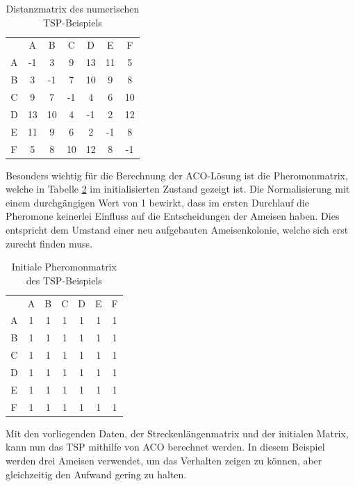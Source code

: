 	\begin{table}
		\centering
		\footnotesize
		\begin{tabular}{c c c c c c c}
			  & A & B & C & D & E & F \\
			A & -1 & 3 & 9 & 13 & 11 & 5\\ 
			B & 3 & -1 & 7 & 10 & 9 & 8\\ 
			C & 9 & 7 & -1 & 4 & 6 & 10\\
			D & 13 & 10 & 4 & -1 & 2 & 12\\
			E & 11 & 9 & 6 & 2 & -1 & 8\\
			F & 5 & 8 & 10 & 12 & 8 & -1\\
		\end{tabular}
		\caption{Distanzmatrix des numerischen \ac{TSP}-Beispiels}
		\label{tspAcoNumerisch_matrix}
	\end{table}

	Besonders wichtig für die Berechnung der \ac{ACO}-Lösung ist die Pheromonmatrix, welche in Tabelle \ref{tspAcoNumerisch_pheromon_initial} im initialisierten Zustand gezeigt ist. Die Normalisierung mit einem durchgängigen Wert von 1 bewirkt, dass im ersten Durchlauf die Pheromone keinerlei Einfluss auf die Entscheidungen der Ameisen haben. Dies entspricht dem Umstand einer neu aufgebauten Ameisenkolonie, welche sich erst zurecht finden muss.
	
	\begin{table}
		\centering
		\footnotesize
		\begin{tabular}{c c c c c c c}
			& A & B & C & D & E & F \\
			A & 1 & 1 & 1 & 1 & 1 & 1\\ 
			B & 1 & 1 & 1 & 1 & 1 & 1\\ 
			C & 1 & 1 & 1 & 1 & 1 & 1\\
			D & 1 & 1 & 1 & 1 & 1 & 1\\
			E & 1 & 1 & 1 & 1 & 1 & 1\\
			F & 1 & 1 & 1 & 1 & 1 & 1\\
		\end{tabular}
		\caption{Initiale Pheromonmatrix des \ac{TSP}-Beispiels}
		\label{tspAcoNumerisch_pheromon_initial}
	\end{table}

	Mit den vorliegenden Daten, der Streckenlängenmatrix und der initialen Matrix, kann nun das \ac{TSP} mithilfe von \ac{ACO} berechnet werden. In diesem Beispiel werden drei Ameisen verwendet, um das Verhalten zeigen zu können, aber gleichzeitig den Aufwand gering zu halten.
	
